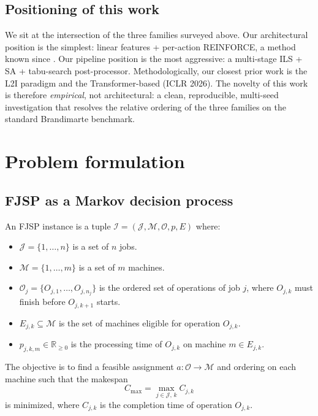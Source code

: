 \documentclass[preprint,review,3p,times,twocolumn]{elsarticle}
\newcommand{\reals}{\mathbb{R}}
\newcommand{\Rplus}{\reals_{\geq 0}}
\begin{document}
\subsection{Positioning of this work}

We sit at the intersection of the three families surveyed
above. Our architectural position is the simplest: linear
features + per-action REINFORCE, a method known since
\citet{Williams1992}. Our pipeline position is the most
aggressive: a multi-stage ILS + SA + tabu-search
post-processor. Methodologically, our closest prior work
is the L2I paradigm \citep{Zhang2024L2I, Hottung2022} and
the Transformer-based \citet{Xiao2026RESCHED} (ICLR 2026).
The novelty of this work is therefore \emph{empirical}, not
architectural: a clean, reproducible, multi-seed
investigation that resolves the relative ordering of the
three families on the standard Brandimarte benchmark.

\section{Problem formulation}
\label{sec:problem}

\subsection{FJSP as a Markov decision process}

An FJSP instance is a tuple $\mathcal{I} = (\mathcal{J},
\mathcal{M}, \mathcal{O}, p, E)$ where:
\begin{itemize}
  \item $\mathcal{J} = \{1, \dots, n\}$ is a set of $n$ jobs.
  \item $\mathcal{M} = \{1, \dots, m\}$ is a set of $m$ machines.
  \item $\mathcal{O}_{j} = \{O_{j,1}, \dots, O_{j,n_j}\}$ is
        the ordered set of operations of job $j$, where
        $O_{j,k}$ must finish before $O_{j,k+1}$ starts.
  \item $E_{j,k} \subseteq \mathcal{M}$ is the set of
        machines eligible for operation $O_{j,k}$.
  \item $p_{j,k,m} \in \Rplus$ is the processing time of
        $O_{j,k}$ on machine $m \in E_{j,k}$.
\end{itemize}

The objective is to find a feasible assignment
$a : \mathcal{O} \to \mathcal{M}$ and ordering on each
machine such that the makespan
\begin{equation}
  C_{\max} = \max_{j \in \mathcal{J},\, k} C_{j,k}
  \label{eq:makespan}
\end{equation}
is minimized, where $C_{j,k}$ is the completion time of
operation $O_{j,k}$.
\end{document}
